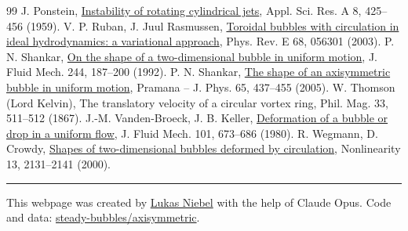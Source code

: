 \documentclass[11pt]{article}
\newcommand{\pagefooter}[1]{\par\bigskip\noindent\rule{\linewidth}{0.4pt}\par\noindent #1\par}
\begin{document}
\begin{thebibliography}{99}
 J. Ponstein, \href{https://doi.org/10.1007/BF00411768}{Instability of rotating cylindrical jets}, Appl. Sci. Res. A 8, 425--456 (1959).
 V. P. Ruban, J. Juul Rasmussen, \href{https://doi.org/10.1103/PhysRevE.68.056301}{Toroidal bubbles with circulation in ideal hydrodynamics: a variational approach}, Phys. Rev. E 68, 056301 (2003).
 P. N. Shankar, \href{https://doi.org/10.1017/S0022112092003021}{On the shape of a two-dimensional bubble in uniform motion}, J. Fluid Mech. 244, 187--200 (1992).
 P. N. Shankar, \href{https://doi.org/10.1007/BF02704202}{The shape of an axisymmetric bubble in uniform motion}, Pramana -- J. Phys. 65, 437--455 (2005).
 W. Thomson (Lord Kelvin), The translatory velocity of a circular vortex ring, Phil. Mag. 33, 511--512 (1867).
 J.-M. Vanden-Broeck, J. B. Keller, \href{https://doi.org/10.1017/S0022112080001863}{Deformation of a bubble or drop in a uniform flow}, J. Fluid Mech. 101, 673--686 (1980).
 R. Wegmann, D. Crowdy, \href{https://doi.org/10.1088/0951-7715/13/6/313}{Shapes of two-dimensional bubbles deformed by circulation}, Nonlinearity 13, 2131--2141 (2000).
\end{thebibliography}

\pagefooter{This webpage was created by \href{https://lukasniebel.github.io}{Lukas Niebel} with the help of Claude Opus. Code and data: \href{https://github.com/steady-bubbles/axisymmetric}{steady-bubbles/axisymmetric}.}
\end{document}
